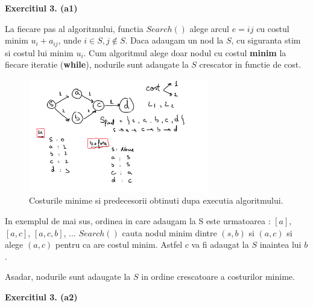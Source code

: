 \documentclass{article}
\begin{document}
 

\textbf{Exercitiul 3. (a1) }

La fiecare pas al algoritmului, functia $Search()$ alege arcul $e = ij$ cu costul minim $u_i + a_{ij}$, unde $i \in S,j \notin S$. Daca adaugam un nod la $S$, cu siguranta stim si costul lui minim $u_i$. Cum algoritmul alege doar nodul cu costul \textbf{minim} la fiecare iteratie (\textbf{while}), nodurile sunt adaugate la $S$ crescator in functie de cost.

\begin{figure}[h!]
  \centering
  \renewcommand{\thefigure}{}
  \includegraphics[width=0.7\textwidth]{example_digraf.jpg}
  \caption{Costurile minime si predecesorii obtinuti dupa executia algoritmului.}
  \label{fig:my_image}
\end{figure}

In exemplul de mai sus, ordinea in care adaugam la S este urmatoarea : $[a]$, $[a, c]$, $[a, c, b]$, ... $Search()$ cauta nodul minim dintre $(s, b)$ si $(a, c)$ si alege $(a, c)$ pentru ca are costul minim. Astfel $c$ va fi adaugat la $S$ inaintea lui $b$.

Asadar, nodurile sunt adaugate la $S$ in ordine crescatoare a costurilor minime.

\textbf{Exercitiul 3. (a2) }
\end{document}

